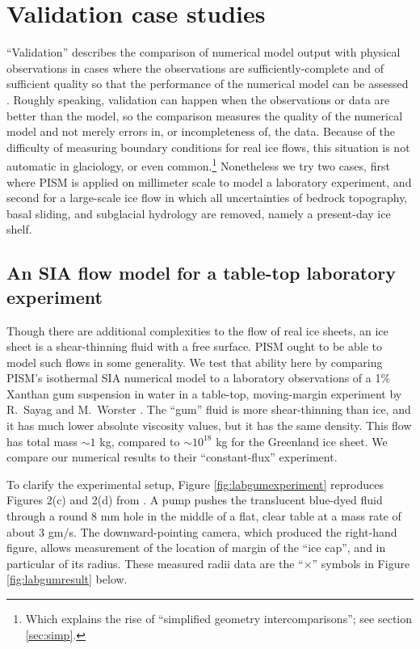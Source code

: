 
\section{Validation case studies}\label{sec:validation} 

``Validation'' describes the comparison of numerical model output with physical observations in cases where the observations are sufficiently-complete and of sufficient quality so that the performance of the numerical model can be assessed \cite{Roache,Wesseling}.  Roughly speaking, validation can happen when the observations or data are better than the model, so the comparison measures the quality of the numerical model and not merely errors in, or incompleteness of, the data.  Because of the difficulty of measuring boundary conditions for real ice flows, this situation is not automatic in glaciology, or even common.\footnote{Which explains the rise of ``simplified geometry intercomparisons''; see section \ref{sec:simp}.}  Nonetheless we try two cases, first where PISM is applied on millimeter scale to model a laboratory experiment, and second for a large-scale ice flow in which all uncertainties of bedrock topography, basal sliding, and subglacial hydrology are removed, namely a present-day ice shelf.

\subsection{An SIA flow model for a table-top laboratory experiment}\label{sec:labgum}
 

Though there are additional complexities to the flow of real ice sheets, an ice sheet is a shear-thinning fluid with a free surface.  PISM ought to be able to model such flows in some generality.  We test that ability here by comparing PISM's isothermal SIA numerical model to a laboratory observations of a 1\% Xanthan gum suspension in water in a table-top, moving-margin experiment by R.~Sayag and M.~Worster \cite{SayagWorster2013,SayagPeglerWorster2012}.  The ``gum'' fluid is more shear-thinning than ice, and it has much lower absolute viscosity values, but it has the same density.  This flow has total mass $\sim 1$ kg, compared to $\sim 10^{18}$ kg for the Greenland ice sheet.  We compare our numerical results to their ``constant-flux'' experiment.

To clarify the experimental setup, Figure \ref{fig:labgumexperiment} reproduces Figures 2(c) and 2(d) from \cite{SayagWorster2013}.  A pump pushes the translucent blue-dyed fluid through a round 8 mm hole in the middle of a flat, clear table at a mass rate of about 3 gm/s.  The downward-pointing camera, which produced the right-hand figure, allows measurement of the location of margin of the ``ice cap'', and in particular of its radius.  These measured radii data are the ``$\times$'' symbols in Figure \ref{fig:labgumresult} below.

